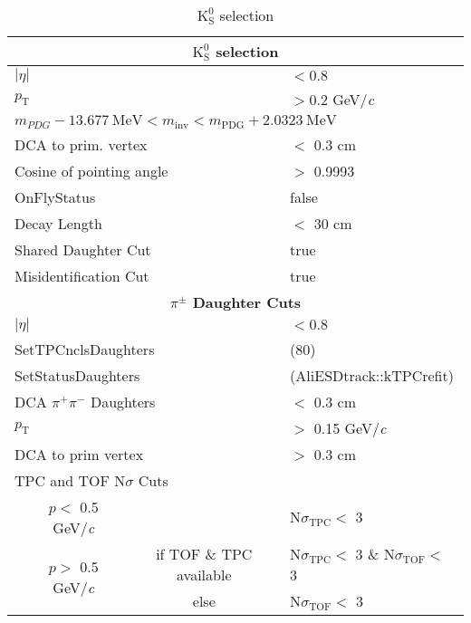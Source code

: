 \documentclass[ALICE,manyauthors]{cernphprep}
\newcommand{\Ks}{$\mathrm{K^{0}_{S}}$\xspace}
\begin{document}
\begin{table}[htbp]
 \centering
  \begin{tabular}{lc|c|l}
   \hline  
   \multicolumn{4}{c}{\textbf{\Ks selection}} \\
   \hline
   \multicolumn{3}{l|}{$|\eta|$} & $< 0.8$ \\
   \hline
   \multicolumn{3}{l|}{$p_{\mathrm{T}}$} & $> 0.2$ GeV/\textit{c} \\
   \hline
   \multicolumn{4}{l}{$m_{PDG}-13.677 \ \mathrm{MeV} < m_{\mathrm{inv}} < m_{\mathrm{PDG}} + 2.0323 \ \mathrm{MeV}$} \\ 
   \hline
   \multicolumn{3}{l|}{DCA to prim. vertex} & $<$ 0.3 cm \\
   \hline
   \multicolumn{3}{l|}{Cosine of pointing angle} & $>$ 0.9993 \\
   \hline
   \multicolumn{3}{l|}{OnFlyStatus} & false \\
   \hline
   \multicolumn{3}{l|}{Decay Length} & $<$ 30 cm \\
   \hline
   \multicolumn{3}{l|}{Shared Daughter Cut} & true \\
   \hline
   \multicolumn{3}{l|}{Misidentification Cut} & true \\
   \hline   
      
   
   \multicolumn{4}{c}{\textbf{$\pi^{\pm}$ Daughter Cuts}} \\
   \hline
   \multicolumn{3}{l|}{$|\eta|$} &  $< 0.8$ \\
   \hline
   \multicolumn{3}{l|}{SetTPCnclsDaughters} & (80) \\
   \hline
   \multicolumn{3}{l|}{SetStatusDaughters} & (AliESDtrack::kTPCrefit) \\
   \hline
   \multicolumn{3}{l|}{DCA $\pi^{+}\pi^{-}$ Daughters} & $<$ 0.3 cm \\
   \hline
   \multicolumn{3}{l|}{$p_{\mathrm{T}}$} & $>$ 0.15 GeV/\textit{c} \\
   \hline
   \multicolumn{3}{l|}{DCA to prim vertex} & $>$ 0.3 cm \\
   \hline
   \multicolumn{4}{l}{TPC and TOF N$\sigma$ Cuts} \\
   \hline
    & \multicolumn{1}{c}{$p <$ 0.5 GeV/\textit{c}} &  & N$\sigma_{\mathrm{TPC}} <$ 3 \\
   \hline
    & \multirow{2}{*}{$p >$ 0.5 GeV/\textit{c}} &  if TOF \& TPC available & N$\sigma_{\mathrm{TPC}} <$ 3 \& N$\sigma_{\mathrm{TOF}} <$ 3 \\
   \cline{3-4}
    & & else & N$\sigma_{\mathrm{TOF}} <$ 3 \\
   \hline   
  \end{tabular}
 \caption{\Ks selection}
 \label{tab:K0sCuts} 
\end{table}
\end{document}
